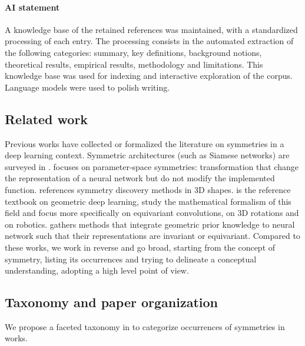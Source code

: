 \documentclass[mathematics,review,submit,moreauthors]{Definitions/mdpi}
\begin{document}
\paragraph{AI statement}
A knowledge base of the retained references was maintained, with a standardized processing of each entry.
The processing consists in the automated extraction of the following categories: summary, key definitions, background notions, theoretical results, empirical results, methodology and limitations.
This knowledge base was used for indexing and interactive exploration of the corpus.
Language models were used to polish writing.

\subsection{Related work}
Previous works have collected or formalized the literature on symmetries in a deep learning context.
Symmetric architectures (such as Siamese networks) are surveyed in \citep{ilina2022sa}.
\citet{zhao2025} focuses on parameter-space symmetries: transformation that change the representation of a neural network but do not modify the implemented function.
\citet{sipiran202523scgpis} references symmetry discovery methods in 3D shapes.
\citet{bronstein2021} is the reference textbook on geometric deep learning,  \citet{gerken2021,carlsson} study the mathematical formalism of this field and \citet{basheer2025ijdsa,habte2023} focus more specifically on equivariant convolutions, \citet{fei2024air} on 3D rotations and \citet{seo2025a} on robotics.
\citet{rath2024air} gathers methods that integrate geometric prior knowledge to neural network such that their representations are invariant or equivariant.
Compared to these works, we work in reverse and go broad, starting from the concept of symmetry, listing its occurrences and trying to delineate a conceptual understanding, adopting a high level point of view.



\subsection{Taxonomy and paper organization}

We propose a faceted taxonomy in  to categorize occurrences of symmetries in works.
\end{document}
